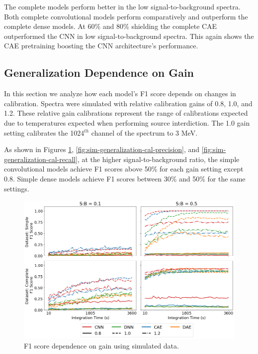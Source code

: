 The complete models perform better in the low signal-to-background spectra. Both complete convolutional models perform comparatively and outperform the complete dense models. At 60\% and 80\% shielding the complete CAE outperformed the CNN in low signal-to-background spectra. This again shows the CAE pretraining boosting the CNN architecture's performance.

\subsection{Generalization Dependence on Gain}

In this section we analyze how each model's F1 score depends on changes in calibration. Spectra were simulated with relative calibration gains of 0.8, 1.0, and 1.2. These relative gain calibrations represent the range of calibrations expected due to temperatures expected when performing source interdiction. The 1.0 gain setting calibrates the 1024$^{th}$ channel of the spectrum to 3 MeV.

As shown in Figures \ref{fig:sim-generalization-cal-f1}, \ref{fig:sim-generalization-cal-precision}, and \ref{fig:sim-generalization-cal-recall}, at the higher signal-to-background ratio, the simple convolutional models achieve F1 scores above 50\% for each gain setting except 0.8. Simple dense models achieve F1 scores between 30\% and 50\% for the same settings.

\begin{figure}[H]
	\centering
	\includegraphics[width=1.0\linewidth]{images/sim-generalization-cal-f1}
	\caption{F1 score dependence on gain using simulated data.}
	\label{fig:sim-generalization-cal-f1}
\end{figure}

